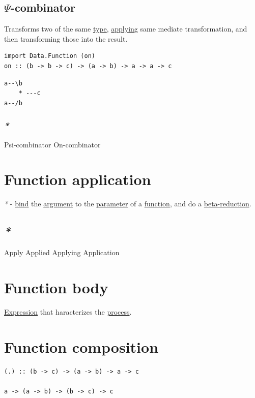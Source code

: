 \documentclass[a4paper,14pt,oneside]{book}
\begin{document}
\subsection{\label{orge5551bf}\(\Psi\)-combinator}
\label{sec:org133a258}
Transforms two of the same \hyperref[orgde40363]{type}, \hyperref[org5db7929]{applying} same mediate transformation, and then transforming those into the result.
\begin{verbatim}
import Data.Function (on)
on :: (b -> b -> c) -> (a -> b) -> a -> a -> c
\end{verbatim}

\begin{verbatim}
a--\b
    * ---c
a--/b
\end{verbatim}

\subsubsection{\emph{*}}
\label{sec:org1ae9837}

\label{org4468784}Psi-combinator
\label{orgef3695d}On-combinator

\section{\label{org64bc23b}Function application}
\label{sec:orgc40cf7f}
\emph{*} - \hyperref[org14c96ba]{bind} the \hyperref[org7be5baf]{argument} to the \hyperref[org08c9428]{parameter} of a \hyperref[orgc39a15c]{function}, and do a \hyperref[orgae23f24]{beta-reduction}.

\subsection{\emph{*}}
\label{sec:org9eee368}

\label{org7791846}Apply
\label{org4970229}Applied
\label{org5db7929}Applying
\label{orgb96b365}Application

\section{\label{org896cf53}Function body}
\label{sec:orgd11f0c5}
\hyperref[org6064e19]{Expression} that haracterizes the \hyperref[org8b072db]{process}.

\section{\label{orgd00d2e8}Function composition}
\label{sec:orgec1d505}
\begin{verbatim}
(.) :: (b -> c) -> (a -> b) -> a -> c

a -> (a -> b) -> (b -> c) -> c
\end{verbatim}
\end{document}
